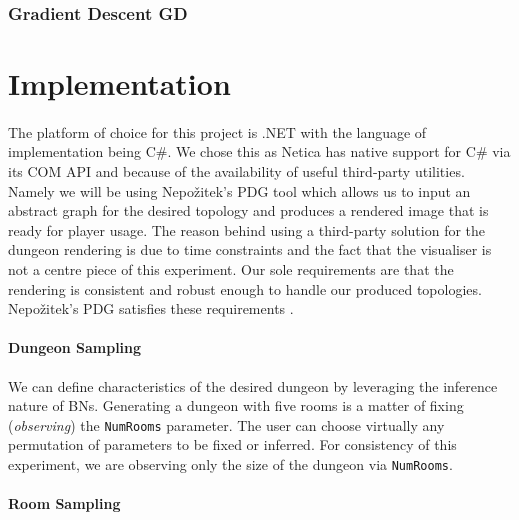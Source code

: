\documentclass{UoYCSproject}
\begin{document}
\subsubsection{Gradient Descent GD}

\section{Implementation}
\paragraph{}
The platform of choice for this project is .NET with the language of implementation being C\#. We chose this as Netica has native support for C\# via its COM API and because of the availability of useful third-party utilities. Namely we will be using Nepo\v{z}itek's PDG tool \parencite{levelGenerator} which allows us to input an abstract graph for the desired topology and produces a rendered image that is ready for player usage. The reason behind using a third-party solution for the dungeon rendering is due to time constraints and the fact that the visualiser is not a centre piece of this experiment. Our sole requirements are that the rendering is consistent and robust enough to handle our produced topologies. Nepo\v{z}itek's PDG satisfies these requirements \parencite{Nepozitek2018FASTCT}.
\label{sec:implementation} %
\paragraph{Dungeon Sampling} %
We can define characteristics of the desired dungeon by leveraging the inference nature of BNs. Generating a dungeon with five rooms is a matter of fixing (\textit{observing}) the \texttt{NumRooms} parameter. The user can choose virtually any permutation of parameters to be fixed or inferred. For consistency of this experiment, we are observing only the size of the dungeon via \texttt{NumRooms}.

\paragraph{Room Sampling}
\end{document}
